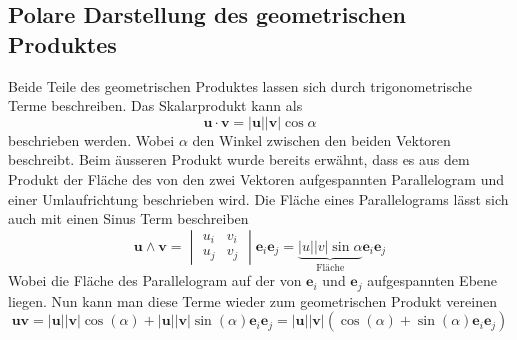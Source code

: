 \subsection{Polare Darstellung des geometrischen Produktes}
Beide Teile des geometrischen Produktes lassen sich durch trigonometrische Terme beschreiben. Das Skalarprodukt kann als 
\begin{equation}
    \textbf{u}\cdot \textbf{v} = |\textbf{u}||\textbf{v}|\cos{\alpha}
\end{equation}
beschrieben werden. Wobei $\alpha$ den Winkel zwischen den beiden Vektoren beschreibt.
\newline
Beim äusseren Produkt wurde bereits erwähnt, dass es aus dem Produkt der Fläche des von den zwei Vektoren aufgespannten Parallelogram und einer Umlaufrichtung beschrieben wird. Die Fläche eines Parallelograms lässt sich auch mit einen Sinus Term beschreiben
\begin{equation}
    \textbf{u} \wedge \textbf{v}
    = 
    \begin{vmatrix} 
        u_i & v_i \\
        u_j & v_j
    \end{vmatrix}\textbf{e}_i\textbf{e}_j  
    = 
    \underbrace{|u||v|\sin{\alpha}}_{\text{Fläche}}\textbf{e}_i\textbf{e}_j
\end{equation}
Wobei die Fläche des Parallelogram auf der von $\textbf{e}_i$ und $\textbf{e}_j$ aufgespannten Ebene liegen.\newline
Nun kann man diese Terme wieder zum geometrischen Produkt vereinen
\begin{equation}
    \textbf{u}\textbf{v}
    = 
    |\textbf{u}||\textbf{v}|\cos{(\alpha)} 
    + 
    |\textbf{u}||\textbf{v}|\sin{(\alpha)} \textbf{e}_i\textbf{e}_j
    = 
    |\textbf{u}||\textbf{v}|(\cos{(\alpha)} + \sin{(\alpha)}\textbf{e}_i\textbf{e}_j)
\end{equation}